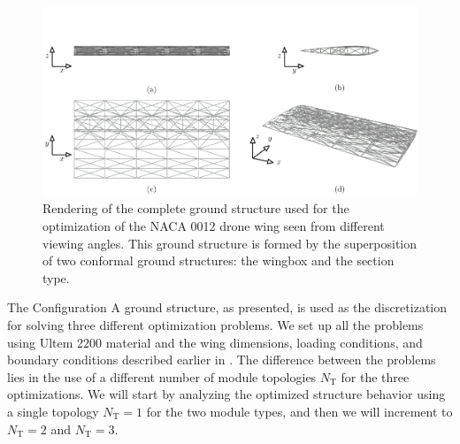 \begin{figure}
    \centering
    \includegraphics[width=\linewidth]{figures/07_aeronautic/00_NACA_gs/gs_a.pdf}
     \caption{Rendering of the complete ground structure used for the optimization of the NACA 0012 drone wing seen from different viewing angles. This ground structure is formed by the superposition of two conformal ground structures: the wingbox and the section type.}
    \label{fig:07_gs_a}
\end{figure}

The Configuration A ground structure, as presented, is used as the discretization for solving three different optimization problems. We set up all the problems using Ultem 2200 material and the wing dimensions, loading conditions, and boundary conditions described earlier in . The difference between the problems lies in the use of a different number of module topologies $N_\text{T}$ for the three optimizations. We will start by analyzing the optimized structure behavior using a single topology $N_\text{T}=1$ for the two module types, and then we will increment to $N_\text{T}=2$ and $N_\text{T}=3$.

